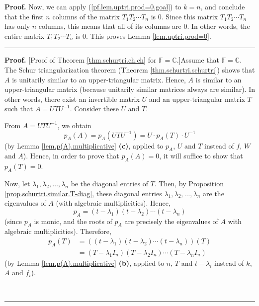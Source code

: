 \documentclass[numbers=enddot,12pt,final,onecolumn,notitlepage]{scrartcl}%
\numberwithin{exer}{subsection}
\theoremstyle{definition}
\newenvironment{proof}[1][Proof]{\noindent\textbf{#1.} }{\ \rule{0.5em}{0.5em}}
\begin{document}
\begin{proof}
Now, we can apply (\ref{pf.lem.uptri.prod=0.goal}) to $k=n$, and conclude that
the first $n$ columns of the matrix $T_{1}T_{2}\cdots T_{n}$ is $0$. Since
this matrix $T_{1}T_{2}\cdots T_{n}$ has only $n$ columns, this means that all
of its columns are $0$. In other words, the entire matrix $T_{1}T_{2}\cdots
T_{n}$ is $0$. This proves Lemma \ref{lem.uptri.prod=0}.
\end{proof}

\begin{proof}
[Proof of Theorem \ref{thm.schurtri.ch.ch} for $\mathbb{F}=\mathbb{C}$.]Assume
that $\mathbb{F}=\mathbb{C}$. The Schur triangularization theorem (Theorem
\ref{thm.schurtri.schurtri}) shows that $A$ is unitarily similar to an
upper-triangular matrix. Hence, $A$ is similar to an upper-triangular matrix
(because unitarily similar matrices always are similar). In other words, there
exist an invertible matrix $U$ and an upper-triangular matrix $T$ such that
$A=UTU^{-1}$. Consider these $U$ and $T$.

From $A=UTU^{-1}$, we obtain
\[
p_{A}\left(  A\right)  =p_{A}\left(  UTU^{-1}\right)  =U\cdot p_{A}\left(
T\right)  \cdot U^{-1}%
\]
(by Lemma \ref{lem.p(A).multiplicative} \textbf{(c)}, applied to $p_{A}$, $U$
and $T$ instead of $f$, $W$ and $A$). Hence, in order to prove that
$p_{A}\left(  A\right)  =0$, it will suffice to show that $p_{A}\left(
T\right)  =0$.

Now, let $\lambda_{1},\lambda_{2},\ldots,\lambda_{n}$ be the diagonal entries
of $T$. Then, by Proposition \ref{prop.schurtri.similar.T-diag}, these
diagonal entries $\lambda_{1},\lambda_{2},\ldots,\lambda_{n}$ are the
eigenvalues of $A$ (with algebraic multiplicities). Hence,%
\[
p_{A}=\left(  t-\lambda_{1}\right)  \left(  t-\lambda_{2}\right)
\cdots\left(  t-\lambda_{n}\right)
\]
(since $p_{A}$ is monic, and the roots of $p_{A}$ are precisely the
eigenvalues of $A$ with algebraic multiplicities). Therefore,%
\begin{align}
p_{A}\left(  T\right)   &  =\left(  \left(  t-\lambda_{1}\right)  \left(
t-\lambda_{2}\right)  \cdots\left(  t-\lambda_{n}\right)  \right)  \left(
T\right) \nonumber\\
&  =\left(  T-\lambda_{1}I_{n}\right)  \left(  T-\lambda_{2}I_{n}\right)
\cdots\left(  T-\lambda_{n}I_{n}\right)
\label{pf.thm.schurtri.ch.ch.F=C.pA(T)=}%
\end{align}
(by Lemma \ref{lem.p(A).multiplicative} \textbf{(b)}, applied to $n$, $T$ and
$t-\lambda_{i}$ instead of $k$, $A$ and $f_{i}$).


\end{proof}
\end{document}
